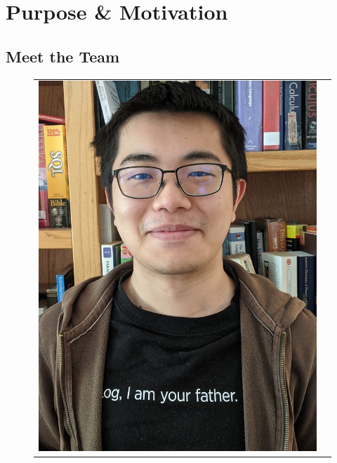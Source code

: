 \documentclass[conference, 12pt, onecolumn]{IEEEtran}
\begin{document}
\section{Purpose \& Motivation}
\subsection{Meet the Team}
\begin{figure}[h!]
\centering
\begin{tabular}{ll}
\includegraphics[scale=.25]{mao.jpg}

\end{tabular}
\end{figure}
\end{document}
